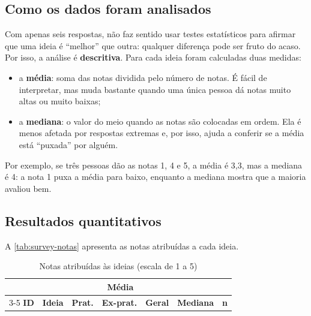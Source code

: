\subsection{Como os dados foram analisados}

Com apenas seis respostas, não faz sentido usar testes estatísticos para
afirmar que uma ideia é ``melhor'' que outra: qualquer diferença pode ser
fruto do acaso. Por isso, a análise é \textbf{descritiva}. Para cada
ideia foram calculadas duas medidas:

\begin{itemize}
  \item a \textbf{média}: soma das notas dividida pelo número de notas. É
        fácil de interpretar, mas muda bastante quando uma única pessoa
        dá notas muito altas ou muito baixas;
  \item a \textbf{mediana}: o valor do meio quando as notas são
        colocadas em ordem. Ela é menos afetada por respostas extremas e,
        por isso, ajuda a conferir se a média está ``puxada'' por alguém.
\end{itemize}

Por exemplo, se três pessoas dão as notas 1, 4 e 5, a média é 3,3, mas a
mediana é 4: a nota 1 puxa a média para baixo, enquanto a mediana mostra
que a maioria avaliou bem.

\subsection{Resultados quantitativos}

A \autoref{tab:survey-notas} apresenta as notas atribuídas a cada ideia.

\begin{table}[H]
  \centering
  \caption{Notas atribuídas às ideias (escala de 1 a 5)}
  \label{tab:survey-notas}
  \footnotesize
  \begin{tabular}{clccccc}
    \toprule
    & & \multicolumn{3}{c}{\textbf{Média}} & & \\
    \cmidrule(lr){3-5}
    \textbf{ID} & \textbf{Ideia} & \textbf{Prat.} & \textbf{Ex-prat.} & \textbf{Geral} & \textbf{Mediana} & \textbf{n} \\
    \midrule
  \end{tabular}
\end{table}

